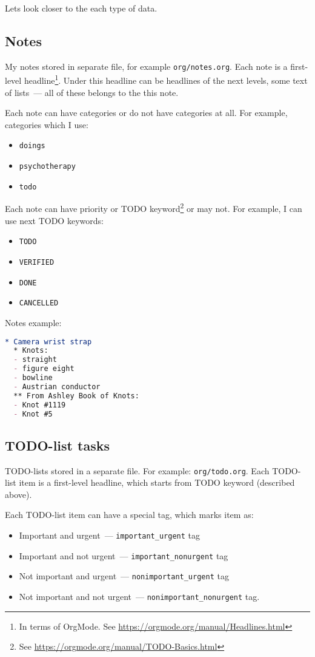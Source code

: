 \documentclass[a4paper,12pt,oneside]{scrartcl}
\begin{document}
Lets look closer to the each type of data.

\subsection{Notes}
\label{sec:notes}

My notes stored in separate file, for example \texttt{org/notes.org}. Each note
is a first-level headline\footnote{In terms of OrgMode. See
  \url{https://orgmode.org/manual/Headlines.html}}. Under this headline can be
headlines of the next levels, some text of lists~--- all of these belongs to
the this note.

Each note can have categories or do not have categories at all. For example,
categories which I use:
\begin{itemize}
\item \texttt{doings}
\item \texttt{psychotherapy}
\item \texttt{todo}
\end{itemize}

Each note can have priority or TODO keyword\footnote{See
  \url{https://orgmode.org/manual/TODO-Basics.html}} or may not. For example, I
can use next TODO keywords:
\begin{itemize}
\item \texttt{TODO}
\item \texttt{VERIFIED}
\item \texttt{DONE}
\item \texttt{CANCELLED}
\end{itemize}

Notes example:
\begin{lstlisting}[language=org]
  * Camera wrist strap
  * Knots:
  - straight
  - figure eight
  - bowline
  - Austrian conductor
  ** From Ashley Book of Knots:
  - Knot #1119
  - Knot #5
\end{lstlisting}

\subsection{TODO-list tasks}
\label{sec:todo-list-tasks}

TODO-lists stored in a separate file. For example: \texttt{org/todo.org}. Each
TODO-list item is a first-level headline, which starts from TODO keyword
(described above).

Each TODO-list item can have a special tag, which marks item as:
\begin{itemize}
\item Important and urgent~--- \texttt{important\_urgent} tag
\item Important and not urgent~--- \texttt{important\_nonurgent} tag
\item Not important and urgent~--- \texttt{nonimportant\_urgent} tag
\item Not important and not urgent~--- \texttt{nonimportant\_nonurgent} tag.
\end{itemize}
\end{document}
